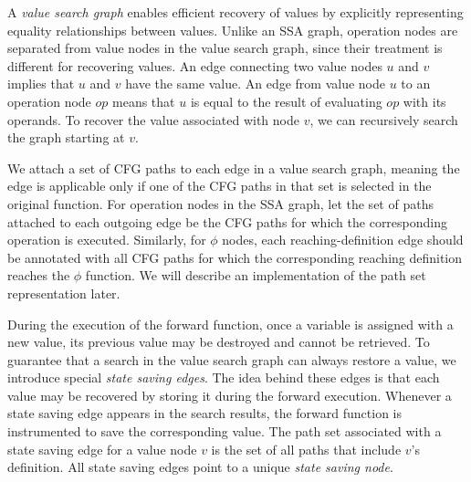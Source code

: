 A \emph{value search graph} enables efficient recovery of values by explicitly representing equality relationships between values. 
Unlike an SSA graph, operation nodes are separated from value nodes in the value search graph, since their treatment is different for recovering values.
An edge connecting two value nodes $u$ and $v$ implies that $u$ and $v$ have the same value. 
An edge from value node $u$ to an operation node $op$ means that  $u$ is equal to the result of evaluating $op$ with its operands. 
To recover the value associated with node $v$, we can recursively search the graph starting at $v$.  

We attach a set of CFG paths to each edge in a value search graph, meaning the edge is applicable only if one of the CFG paths in that set is selected in the original function.
For operation nodes in the SSA graph, let the set of paths attached to each outgoing edge be the CFG paths for which the corresponding operation is executed. 
Similarly, for $\phi$ nodes, each reaching-definition edge should be annotated with all CFG paths for which the corresponding reaching definition reaches the $\phi$ function. 
We will describe an implementation of the path set representation later.

During the execution of the forward function, once a variable is assigned with a new value, its previous value may be destroyed and cannot be retrieved. To guarantee that a search in the value search graph can always restore a value, we introduce special \emph{state saving edges}. 
The idea behind these edges is that each value may be recovered by storing it during the forward execution. 
Whenever a state saving edge appears in the search results, the forward function is instrumented to save the corresponding value. 
The path set associated with a state saving edge for a value node $v$ is the set of all paths that include $v$'s definition. All state saving edges point to a unique \emph{state saving node}. %

